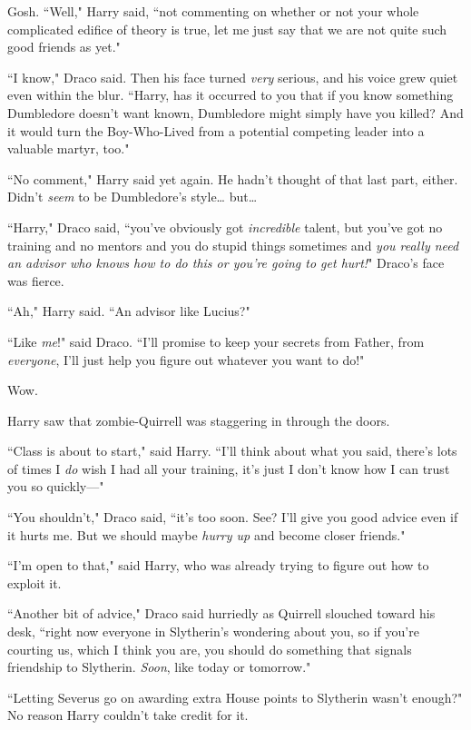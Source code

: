 Gosh. ``Well," Harry said, ``not commenting on whether or not your whole complicated edifice of theory is true, let me just say that we are not quite such good friends as yet."

``I know," Draco said. Then his face turned \emph{very} serious, and his voice grew quiet even within the blur. ``Harry, has it occurred to you that if you know something Dumbledore doesn't want known, Dumbledore might simply have you killed? And it would turn the Boy-Who-Lived from a potential competing leader into a valuable martyr, too."

``No comment," Harry said yet again. He hadn't thought of that last part, either. Didn't \emph{seem} to be Dumbledore's style{\ldots} but{\ldots}

``Harry," Draco said, ``you've obviously got \emph{incredible} talent, but you've got no training and no mentors and you do stupid things sometimes and \emph{you really need an advisor who knows how to do this or you're going to get hurt!}" Draco's face was fierce.

``Ah," Harry said. ``An advisor like Lucius?"

``Like \emph{me}!" said Draco. ``I'll promise to keep your secrets from Father, from \emph{everyone}, I'll just help you figure out whatever you want to do!"

Wow.

Harry saw that zombie-Quirrell was staggering in through the doors.

``Class is about to start," said Harry. ``I'll think about what you said, there's lots of times I \emph{do} wish I had all your training, it's just I don't know how I can trust you so quickly—"

``You shouldn't," Draco said, ``it's too soon. See? I'll give you good advice even if it hurts me. But we should maybe \emph{hurry up} and become closer friends."

``I'm open to that," said Harry, who was already trying to figure out how to exploit it.

``Another bit of advice," Draco said hurriedly as Quirrell slouched toward his desk, ``right now everyone in Slytherin's wondering about you, so if you're courting us, which I think you are, you should do something that signals friendship to Slytherin. \emph{Soon}, like today or tomorrow."

``Letting Severus go on awarding extra House points to Slytherin wasn't enough?" No reason Harry couldn't take credit for it.

